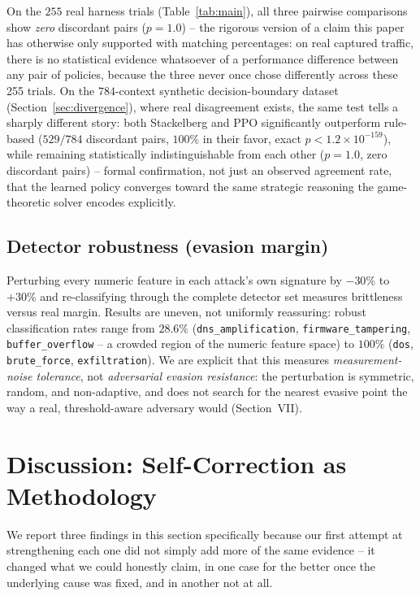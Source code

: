 \documentclass[conference]{IEEEtran}
\begin{document}
On the $255$ real harness trials (Table~\ref{tab:main}), all three pairwise comparisons show
\emph{zero} discordant pairs ($p=1.0$) -- the rigorous version of a claim this paper has otherwise
only supported with matching percentages: on real captured traffic, there is no statistical
evidence whatsoever of a performance difference between any pair of policies, because the three
never once chose differently across these 255 trials. On the $784$-context synthetic
decision-boundary dataset (Section~\ref{sec:divergence}), where real disagreement exists, the same
test tells a sharply different story: both Stackelberg and PPO significantly outperform rule-based
($529/784$ discordant pairs, $100\%$ in their favor, exact $p<1.2\times10^{-159}$), while remaining
statistically indistinguishable from each other ($p=1.0$, zero discordant pairs) -- formal
confirmation, not just an observed agreement rate, that the learned policy converges toward the
same strategic reasoning the game-theoretic solver encodes explicitly.

\subsection{Detector robustness (evasion margin)}
\label{sec:evasion}

Perturbing every numeric feature in each attack's own signature by $-30\%$ to $+30\%$ and
re-classifying through the complete detector set measures brittleness versus real margin. Results
are uneven, not uniformly reassuring: robust classification rates range from $28.6\%$
(\texttt{dns\_amplification}, \texttt{firmware\_tampering}, \texttt{buffer\_overflow} -- a crowded
region of the numeric feature space) to $100\%$ (\texttt{dos}, \texttt{brute\_force},
\texttt{exfiltration}). We are explicit that this measures \emph{measurement-noise tolerance}, not
\emph{adversarial evasion resistance}: the perturbation is symmetric, random, and non-adaptive, and
does not search for the nearest evasive point the way a real, threshold-aware adversary would
(Section~VII).

\section{Discussion: Self-Correction as Methodology}
\label{sec:corrections}

We report three findings in this section specifically because our first attempt at strengthening
each one did not simply add more of the same evidence -- it changed what we could honestly claim,
in one case for the better once the underlying cause was fixed, and in another not at all.
\end{document}
